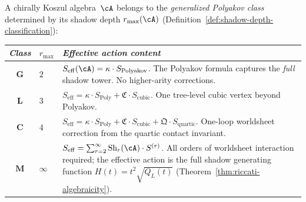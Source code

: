 \begin{definition}
\label{def:generalized-polyakov-class}
A chirally Koszul algebra~$\cA$ belongs to the
\emph{generalized Polyakov class} determined by its shadow
depth $r_{\max}(\cA)$
(Definition~\ref{def:shadow-depth-classification}):
\begin{center}
\small
\renewcommand{\arraystretch}{1.25}
\begin{tabular}{@{}clp{24em}@{}}
\toprule
\emph{Class} & $r_{\max}$ & \emph{Effective action content} \\
\midrule
$\mathbf{G}$ & $2$
  & $S_{\mathrm{eff}}(\cA) = \kappa \cdot S_{\mathrm{Polyakov}}$.
    The Polyakov formula captures the \emph{full} shadow tower.
    No higher-arity corrections. \\[4pt]
$\mathbf{L}$ & $3$
  & $S_{\mathrm{eff}} = \kappa \cdot S_{\mathrm{Poly}}
    + \mathfrak{C} \cdot S_{\mathrm{cubic}}$.
    One tree-level cubic vertex beyond Polyakov. \\[4pt]
$\mathbf{C}$ & $4$
  & $S_{\mathrm{eff}} = \kappa \cdot S_{\mathrm{Poly}}
    + \mathfrak{C} \cdot S_{\mathrm{cubic}}
    + \mathfrak{Q} \cdot S_{\mathrm{quartic}}$.
    One-loop worldsheet correction from the quartic contact
    invariant. \\[4pt]
$\mathbf{M}$ & $\infty$
  & $S_{\mathrm{eff}} = \sum_{r=2}^{\infty}
    \mathrm{Sh}_r(\cA) \cdot S^{(r)}$.
    All orders of worldsheet interaction required; the
    effective action is the full shadow generating
    function $H(t) = t^2\sqrt{Q_L(t)}$
    \textup{(}Theorem~\textup{\ref{thm:riccati-algebraicity})}. \\
\bottomrule
\end{tabular}
\end{center}
\end{definition}


